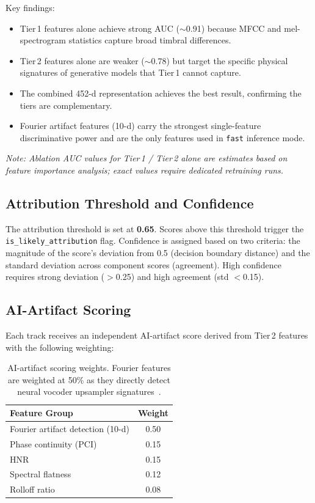 \documentclass[11pt,a4paper]{article}
\begin{document}
Key findings:
\begin{itemize}[nosep]
  \item Tier\,1 features alone achieve strong AUC ($\sim$0.91) because MFCC and mel-spectrogram statistics capture broad timbral differences.
  \item Tier\,2 features alone are weaker ($\sim$0.78) but target the specific physical signatures of generative models that Tier\,1 cannot capture.
  \item The combined 452-d representation achieves the best result, confirming the tiers are complementary.
  \item Fourier artifact features (10-d) carry the strongest single-feature discriminative power and are the only features used in \texttt{fast} inference mode.
\end{itemize}

\textit{Note: Ablation AUC values for Tier\,1 / Tier\,2 alone are estimates based on feature importance analysis; exact values require dedicated retraining runs.}

\subsection{Attribution Threshold and Confidence}

The attribution threshold is set at \textbf{0.65}. Scores above this threshold trigger the \texttt{is\_likely\_attribution} flag. Confidence is assigned based on two criteria: the magnitude of the score's deviation from 0.5 (decision boundary distance) and the standard deviation across component scores (agreement). High confidence requires strong deviation ($>$0.25) and high agreement (std $<$0.15).

\subsection{AI-Artifact Scoring}

Each track receives an independent AI-artifact score derived from Tier\,2 features with the following weighting:

\begin{table}[H]
\centering
\begin{tabular}{lc}
\toprule
\textbf{Feature Group} & \textbf{Weight} \\
\midrule
Fourier artifact detection (10-d) & 0.50 \\
Phase continuity (PCI) & 0.15 \\
HNR & 0.15 \\
Spectral flatness & 0.12 \\
Rolloff ratio & 0.08 \\
\bottomrule
\end{tabular}
\caption{AI-artifact scoring weights. Fourier features are weighted at 50\% as they directly detect neural vocoder upsampler signatures~\cite{A1}.}
\end{table}
\end{document}
